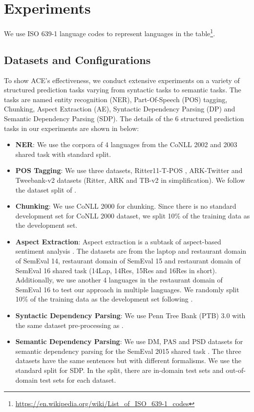 \documentclass[11pt,a4paper]{article}
\begin{document}
\section{Experiments}
We use ISO 639-1 language codes to represent languages in the table\footnote{\url{https://en.wikipedia.org/wiki/List_of_ISO_639-1_codes}}.

\subsection{Datasets and Configurations}
\label{sec:datasets}
To show ACE's effectiveness, we conduct extensive experiments on a variety of structured prediction tasks varying from syntactic tasks to semantic tasks. The tasks are named entity recognition (NER), Part-Of-Speech (POS) tagging, Chunking, Aspect Extraction (AE), Syntactic Dependency Parsing (DP) and Semantic Dependency Parsing (SDP).
The details of the 6 structured prediction tasks in our experiments are shown in below:
\begin{itemize}[leftmargin=*]
    \item {\bf NER}: We use the corpora of 4 languages from the CoNLL 2002 and 2003 shared task \citep{tjong-kim-sang-2002-introduction,tjong-kim-sang-de-meulder-2003-introduction} with standard split.
    \item {\bf POS Tagging}: We use three datasets, Ritter11-T-POS \citep{ritter-etal-2011-named}, ARK-Twitter \citep{gimpel-etal-2011-part,owoputi-etal-2013-improved} and Tweebank-v2 \citep{liu-etal-2018-parsing} datasets (Ritter, ARK and TB-v2 in simplification). We follow the dataset split of \citet{nguyen2020bertweet}.
    \item {\bf Chunking}: We use CoNLL 2000 \citep{tjong-kim-sang-buchholz-2000-introduction} for chunking. Since there is no standard development set for CoNLL 2000 dataset, we split 10\% of the training data as the development set.
    \item {\bf Aspect Extraction}: Aspect extraction is a subtask of aspect-based sentiment analysis \citep{pontiki-etal-2014-semeval,pontiki-etal-2015-semeval,pontiki-etal-2016-semeval}. The datasets are from the laptop and restaurant domain of SemEval 14, restaurant domain of SemEval 15 and restaurant domain of  SemEval 16 shared task (14Lap, 14Res, 15Res and 16Res in short). Additionally, we use another 4 languages in the restaurant domain of SemEval 16 to test our approach in multiple languages. We randomly split 10\% of the training data as the development set following \citet{li-etal-2019-exploiting}.
    \item {\bf Syntactic Dependency Parsing}: We use Penn Tree Bank (PTB) 3.0 with the same dataset pre-processing as \citep{ma-etal-2018-stack}.
    \item {\bf Semantic Dependency Parsing}: We use DM, PAS and PSD datasets for semantic dependency parsing \citep{oepensemeval} for the SemEval 2015 shared task \citep{oepen2015semeval}. The three datasets have the same sentences but with different formalisms. We use the standard split for SDP. In the split, there are in-domain test sets and out-of-domain test sets for each dataset.
\end{itemize}
\end{document}
